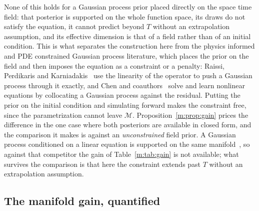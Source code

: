 None of this holds for a Gaussian process prior placed directly on the space time field: that posterior is supported on the whole function space, its draws do not satisfy the equation, it cannot predict beyond $T$ without an extrapolation assumption, and its effective dimension is that of a field rather than of an initial condition. This is what separates the construction here from the physics informed and PDE constrained Gaussian process literature, which places the prior on the field and then imposes the equation as a constraint or a penalty: Raissi, Perdikaris and Karniadakis~\cite{raissi2017} use the linearity of the operator to push a Gaussian process through it exactly, and Chen and coauthors~\cite{chen2021} solve and learn nonlinear equations by collocating a Gaussian process against the residual. Putting the prior on the initial condition and simulating forward makes the constraint free, since the parametrization cannot leave $\mathcal M$. Proposition~\ref{m:prop:gain} prices the difference in the one case where both posteriors are available in closed form, and the comparison it makes is against an \emph{unconstrained} field prior. A Gaussian process conditioned on a linear equation is supported on the same manifold~\cite{albertrath2020}, so against that competitor the gain of Table~\ref{m:tab:gain} is not available; what survives the comparison is that here the constraint extends past $T$ without an extrapolation assumption.

\subsection{The manifold gain, quantified}

